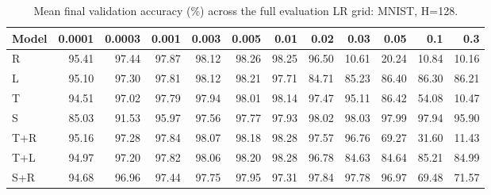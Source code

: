 \begin{table}[htbp]
\centering
\caption{Mean final validation accuracy (\%) across the full evaluation LR grid: MNIST, H=128.}
\label{tab:lrmat:mnist:128}
\scriptsize
\begin{tabular}{@{}lrrrrrrrrrrr@{}}
\toprule
Model & 0.0001 & 0.0003 & 0.001 & 0.003 & 0.005 & 0.01 & 0.02 & 0.03 & 0.05 & 0.1 & 0.3 \\
\midrule
R & 95.41 & 97.44 & 97.87 & 98.12 & 98.26 & 98.25 & 96.50 & 10.61 & 20.24 & 10.84 & 10.16 \\
L & 95.10 & 97.30 & 97.81 & 98.12 & 98.21 & 97.71 & 84.71 & 85.23 & 86.40 & 86.30 & 86.21 \\
T & 94.51 & 97.02 & 97.79 & 97.94 & 98.01 & 98.14 & 97.47 & 95.11 & 86.42 & 54.08 & 10.47 \\
S & 85.03 & 91.53 & 95.97 & 97.56 & 97.77 & 97.93 & 98.02 & 98.03 & 97.99 & 97.94 & 95.90 \\
T+R & 95.16 & 97.28 & 97.84 & 98.07 & 98.18 & 98.28 & 97.57 & 96.76 & 69.27 & 31.60 & 11.43 \\
T+L & 94.97 & 97.20 & 97.82 & 98.06 & 98.20 & 98.28 & 96.78 & 84.63 & 84.64 & 85.21 & 84.99 \\
S+R & 94.68 & 96.96 & 97.44 & 97.75 & 97.95 & 97.31 & 97.84 & 97.78 & 96.97 & 69.48 & 71.57 \\
\bottomrule
\end{tabular}
\end{table}
